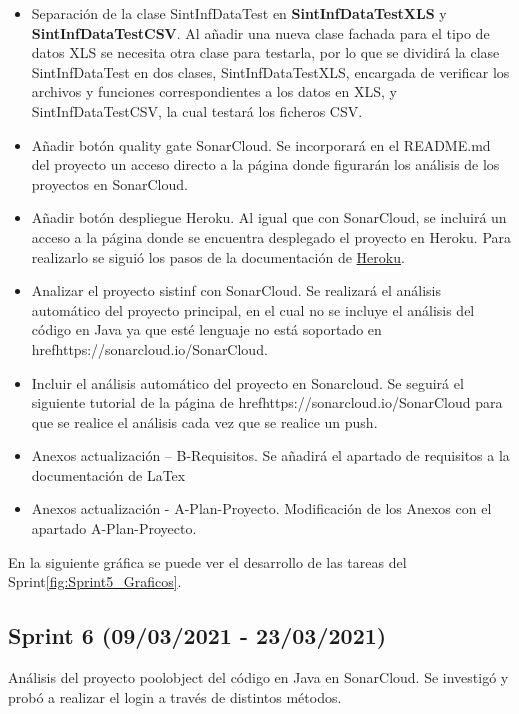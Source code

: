 \begin{itemize}
	\item Separación de la clase SintInfDataTest en \textbf{SintInfDataTestXLS} y \textbf{SintInfDataTestCSV}.
		 Al añadir una nueva clase fachada para el tipo de datos XLS se necesita otra clase para testarla, por lo que se dividirá la clase SintInfDataTest en dos clases, SintInfDataTestXLS, encargada de verificar los archivos y funciones correspondientes a los datos en XLS, y SintInfDataTestCSV, la cual testará los ficheros CSV.
	 \item Añadir botón quality gate SonarCloud. 
		 Se incorporará en el README.md del proyecto un acceso directo a la página donde figurarán los análisis de los proyectos en SonarCloud. 
	 \item Añadir botón despliegue Heroku.
	  	Al igual que con SonarCloud, se incluirá un acceso a la página donde se encuentra desplegado el proyecto en Heroku. Para realizarlo se siguió los pasos de la documentación de \href{https://devcenter.heroku.com/articles/heroku-button}{Heroku}.
	 \item Analizar el proyecto sistinf con SonarCloud. 
	 	Se realizará el análisis automático del proyecto principal, en el cual no se incluye el análisis del código en Java ya que esté lenguaje no está soportado en href{https://sonarcloud.io/}{SonarCloud}.
	 \item Incluir el análisis automático del proyecto en Sonarcloud. 
	 	Se seguirá el siguiente tutorial de la página de href{https://sonarcloud.io/}{SonarCloud} para que se realice el análisis cada vez que se realice un push.  
	 \item Anexos actualización – B-Requisitos. 
	 	Se añadirá el apartado de requisitos a la documentación de LaTex
	 \item Anexos actualización - A-Plan-Proyecto.
	  	Modificación de los Anexos con el apartado A-Plan-Proyecto.	
	
\end{itemize}

En la siguiente gráfica se puede ver el desarrollo de las tareas del Sprint\ref{fig:Sprint5_Graficos}.


\subsection{Sprint 6 (09/03/2021 - 23/03/2021)}
Análisis del proyecto poolobject del código en Java en SonarCloud. Se investigó y probó a realizar el login a través de distintos métodos.


